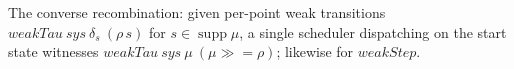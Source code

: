 \begin{lemma}
  \label{lem:mix}
  \leanok
  The converse recombination: given per-point weak transitions $weakTau\ sys\ \delta_s\ (\rho\,s)$ for $s \in \operatorname{supp}\mu$, a single scheduler dispatching on the start state witnesses $weakTau\ sys\ \mu\ (\mu \mathbin{\gg\!=} \rho)$; likewise for $weakStep$.
\end{lemma}
